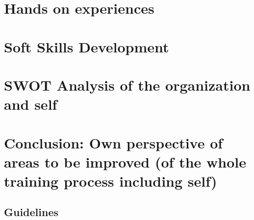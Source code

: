 \documentclass[a4paper,12pt]{report}%
\begin{document}
\chapter{Hands on experiences}

\chapter{Soft Skills Development}

\chapter{SWOT Analysis of the organization and self}

\chapter{Conclusion: Own perspective of areas to be improved (of the whole training process including self)}


\begin{appendices}
	\chapter{Guidelines}
\end{appendices}

\twocolumn



\end{document}
